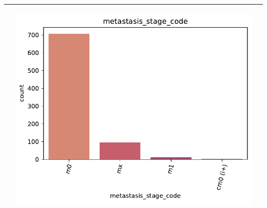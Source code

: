 \begin{table}[htb!]
\begin{threeparttable}
\begin{tabular}{p{2.5cm} p{7cm} p{6.5cm}}
			& \begin{center}\includegraphics[width=1\linewidth]{NOTEBOOK/IMAGENES_DESCRIPTIVAS/2_metastasis_stage_code}\end{center}
			\\ \hline
		\end{tabular}
	\end{threeparttable}
\end{table}
\clearpage
